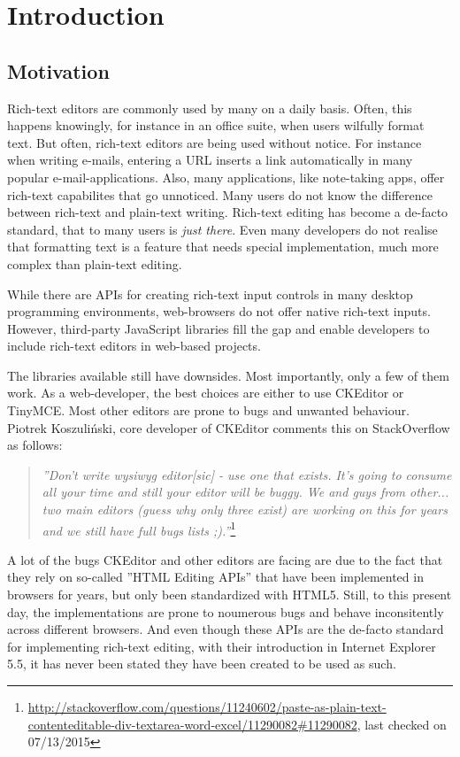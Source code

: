 \chapter{Introduction}
\section{Motivation}

Rich-text editors are commonly used by many on a daily basis. Often, this happens knowingly, for instance in an office suite, when users wilfully format text. But often, rich-text editors are being used without notice. For instance when writing e-mails, entering a URL inserts a link automatically in many popular e-mail-applications. Also, many applications, like note-taking apps, offer rich-text capabilites that go unnoticed. Many users do not know the difference between rich-text and plain-text writing. Rich-text editing has become a de-facto standard, that to many users is \textit{just there}. Even many developers do not realise that formatting text is a feature that needs special implementation, much more complex than plain-text editing.

While there are APIs for creating rich-text input controls in many desktop programming environments, web-browsers do not offer native rich-text inputs. However, third-party JavaScript libraries fill the gap and enable developers to include rich-text editors in web-based projects.

The libraries available still have downsides. Most importantly, only a few of them work. As a web-developer, the best choices are either to use CKEditor or TinyMCE. Most other editors are prone to bugs and unwanted behaviour. Piotrek Koszuli\'{n}ski, core developer of CKEditor comments this on StackOverflow as follows:

\begin{quotation}
\textit{''Don't write wysiwyg editor[sic] - use one that exists. It's going to consume all your time and still your editor will be buggy. We and guys from other... two main editors (guess why only three exist) are working on this for years and we still have full bugs lists ;).''}\footnote{\url{http://stackoverflow.com/questions/11240602/paste-as-plain-text-contenteditable-div-textarea-word-excel/11290082#11290082}, last checked on 07/13/2015}
\end{quotation}

A lot of the bugs CKEditor and other editors are facing are due to the fact that they rely on so-called ''HTML Editing APIs'' that have been implemented in browsers for years, but only been standardized with HTML5. Still, to this present day, the implementations are prone to noumerous bugs and behave inconsitently across different browsers. And even though these APIs are the de-facto standard for implementing rich-text editing, with their introduction in Internet Explorer 5.5, it has never been stated they have been created to be used as such.

